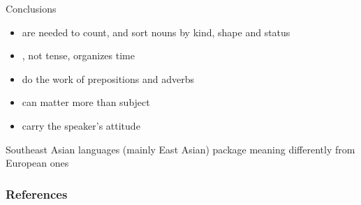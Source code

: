 \documentclass{beamer}
\begin{document}
\begin{frame}{Conclusions}
  \Large
  \begin{itemize}
  \item {} are needed to count, and sort nouns by kind,
    shape and status
  \item {}, not tense, organizes time
  \item {} do the work of prepositions and adverbs
  \item {} can matter more than subject
  \item {} carry the speaker's attitude
  \end{itemize}
  \vfill
  \normalsize
  Southeast Asian languages (mainly East Asian) package meaning differently from European ones
\end{frame}



\begin{frame}[allowframebreaks]
        \frametitle{References}
        
        
\end{frame}
\end{document}
